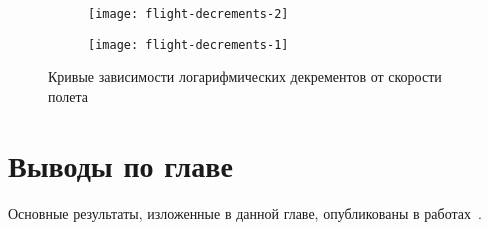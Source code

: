 \def\sfFlight{0.48\textwidth}

\begin{figure}[!htb]
	\begin{subfigure}[b]{\sfFlight}
		\centering
     	\texttt{[image: flight-decrements-2]} 
    \end{subfigure}
    \hfill
    \begin{subfigure}[b]{\sfFlight}
		\centering
		\texttt{[image: flight-decrements-1]}
    \end{subfigure}
    \caption{Кривые зависимости логарифмических декрементов от скорости полета} \label{fig:flight-decrements}
\end{figure}

\section{Выводы по главе \thechapter}


Основные результаты, изложенные в данной главе, опубликованы в работах~\cite{lib:author:iss2017:crackIdentification, lib:author:gorshkov:crackIdentification, lib:author:iss2018:crackIdentification, lib:author:metal:crackIdentification, lib:author:nti2019:gvt, lib:author:metal:gapsIdentification, lib:author:certificate:GenCalc, lib:author:certificate:ResponseAnalyzer, lib:author:certificate:DistortionFinder, lib:author:sibnia2021:ModalData, lib:author:sibnia2021:defects, lib:author:chinese:defects, lib:author:iss2021:defects, lib:author:flight:modalData, lib:author:flight:defects, lib:author:iss2022:oma, lib:author:tsagi:defects, lib:author:certificate:FlightLab}.